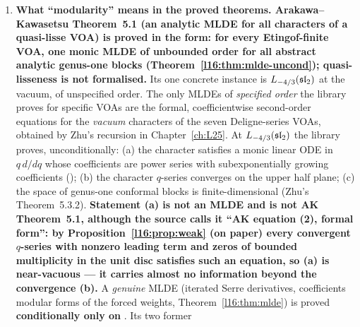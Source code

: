 \begin{enumerate}
  . After this chapter's finding, a later revision of the library restated it without
  hypotheses, as the one-line proof ; the two twins now have
  \emph{identical} types, and so do the twins \allowbreak{}\allowbreak{} and
  \allowbreak{}\allowbreak{}. The conditional forms survive only as
  \allowbreak{}\allowbreak{}\allowbreak{} and
  \allowbreak{}\allowbreak{}\allowbreak{}, whose hypothesis
   is unproved and redundant. Throughout this chapter we always write the namespace.
\item \textbf{What ``modularity'' means in the proved theorems. Arakawa--Kawasetsu Theorem~5.1 (an analytic MLDE
  for all characters of a quasi-lisse VOA) is proved in the form: for every Etingof-finite VOA, one monic MLDE of
  unbounded order for all abstract analytic genus-one blocks (Theorem~\ref{l16:thm:mlde-uncond}); quasi-lisseness is not
  formalised.} Its one concrete instance is $L_{-4/3}(\mathfrak{sl}_2)$ at the vacuum, of unspecified order. The only MLDEs of
  \emph{specified order} the library proves for specific VOAs are the formal, coefficientwise second-order equations for the \emph{vacuum} characters of the seven Deligne-series
  VOAs, obtained by Zhu's recursion in Chapter~\ref{ch:L25}. At $L_{-4/3}(\mathfrak{sl}_2)$ the
  library proves, unconditionally: (a) the character satisfies a monic linear ODE in $q\,d/dq$ whose
  coefficients are power series with subexponentially growing coefficients
  (\allowbreak{}\allowbreak{}\allowbreak{}); (b) the character $q$-series converges on the
  upper half plane; (c) the space of genus-one conformal blocks is finite-dimensional (Zhu's
  Theorem~5.3.2). \textbf{Statement (a) is not an MLDE and is not AK Theorem~5.1, although the source calls
  it ``AK equation (2), formal form'': by Proposition~\ref{l16:prop:weak} (on paper) every convergent
  $q$-series with nonzero leading term and zeros of bounded multiplicity in the unit disc satisfies such an
  equation, so (a) is near-vacuous --- it carries almost no information beyond the convergence (b).} A
  \emph{genuine} MLDE (iterated Serre derivatives, coefficients modular forms of the forced weights,
  Theorem~\ref{l16:thm:mlde}) is proved \textbf{conditionally only on }. Its two former

\end{enumerate}
